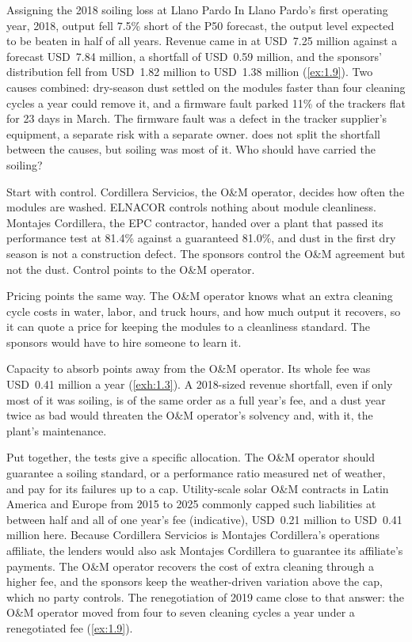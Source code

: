 \begin{example}{Assigning the 2018 soiling loss at Llano Pardo \illustrative}\label{ex:2.2}
In Llano Pardo's first operating year, 2018, output fell 7.5\% short of the P50 forecast, the output level expected to be beaten in half of all years. Revenue came in at USD~7.25 million against a forecast USD~7.84 million, a shortfall of USD~0.59 million, and the sponsors' distribution fell from USD~1.82 million to USD~1.38 million (\cref{ex:1.9}). Two causes combined: dry-season dust settled on the modules faster than four cleaning cycles a year could remove it, and a firmware fault parked 11\% of the trackers flat for 23 days in March. The firmware fault was a defect in the tracker supplier's equipment, a separate risk with a separate owner.  does not split the shortfall between the causes, but soiling was most of it. Who should have carried the soiling?

Start with control. Cordillera Servicios, the O\&M operator, decides how often the modules are washed. ELNACOR controls nothing about module cleanliness. Montajes Cordillera, the EPC contractor, handed over a plant that passed its performance test at 81.4\% against a guaranteed 81.0\%, and dust in the first dry season is not a construction defect. The sponsors control the O\&M agreement but not the dust. Control points to the O\&M operator.

Pricing points the same way. The O\&M operator knows what an extra cleaning cycle costs in water, labor, and truck hours, and how much output it recovers, so it can quote a price for keeping the modules to a cleanliness standard. The sponsors would have to hire someone to learn it.

Capacity to absorb points away from the O\&M operator. Its whole fee was USD~0.41 million a year (\cref{exh:1.3}). A 2018-sized revenue shortfall, even if only most of it was soiling, is of the same order as a full year's fee, and a dust year twice as bad would threaten the O\&M operator's solvency and, with it, the plant's maintenance.

Put together, the tests give a specific allocation. The O\&M operator should guarantee a soiling standard, or a performance ratio measured net of weather, and pay for its failures up to a cap. Utility-scale solar O\&M contracts in Latin America and Europe from 2015 to 2025 commonly capped such liabilities at between half and all of one year's fee (indicative), USD~0.21 million to USD~0.41 million here. Because Cordillera Servicios is Montajes Cordillera's operations affiliate, the lenders would also ask Montajes Cordillera to guarantee its affiliate's payments. The O\&M operator recovers the cost of extra cleaning through a higher fee, and the sponsors keep the weather-driven variation above the cap, which no party controls. The renegotiation of 2019 came close to that answer: the O\&M operator moved from four to seven cleaning cycles a year under a renegotiated fee (\cref{ex:1.9}).
\end{example}


